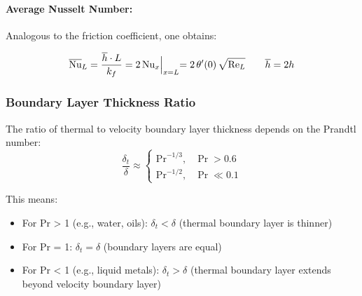 %
\paragraph{Average Nusselt Number:}
Analogous to the friction coefficient, one obtains:
\begin{definition}
    \[
      \overline{\text{Nu}}_L = \frac{\overline{h}\cdot L}{k_f}=2\,\text{Nu}_x\Bigl|_{x=L} = 2\,\theta'(0)\,\sqrt{\text{Re}_L}
      \qquad \overline{h} = 2 h
    \]
\end{definition}
\subsubsection*{Boundary Layer Thickness Ratio}
The ratio of thermal to velocity boundary layer thickness depends on the Prandtl number:
\[
\frac{\delta_t}{\delta} \approx \begin{cases}
\text{Pr}^{-1/3}, & \operatorname{Pr} > 0.6 
\\[1em]
\text{Pr}^{-1/2}, & \operatorname{Pr} \ll 0.1
\end{cases}
\]

This means:
\begin{itemize}
    \item For Pr > 1 (e.g., water, oils): $\delta_t < \delta$ (thermal boundary layer is thinner)
    \item For Pr = 1: $\delta_t = \delta$ (boundary layers are equal)
    \item For Pr < 1 (e.g., liquid metals): $\delta_t > \delta$ (thermal boundary layer extends beyond velocity boundary layer)
\end{itemize}
